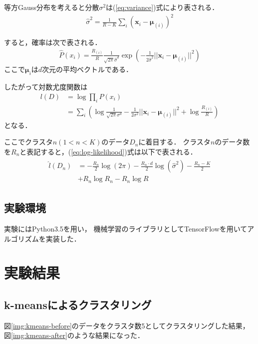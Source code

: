 \documentclass[10pt,a4j,twocolumn]{ltjsarticle}
\def\figref#1{図\ref{#1}}
\def\eqref#1{(\ref{#1})式}
\begin{document}
等方Gauss分布を考えると分散$\sigma^2$は\eqref{eq:variance}により表される．
\begin{align}
  \label{eq:variance}
  \hat{\sigma}^2 = \frac{1}{R-K}\sum_i\left({\bm x}_i-{\bm \mu}_{(i)}\right)^2
\end{align}

すると，確率は次で表される．
\begin{align}
  \label{eq:gaussian-distribution}
  \hat{P}(x_i) = \frac{R_{(i)}}{R}\frac{1}{\sqrt{2\pi}\hat{\sigma}^d}
    \exp\left(-\frac{1}{2\hat{\sigma}^2}||{\bm x}_i-{\bm \mu}_{(i)}||^2\right)
\end{align}
ここで${\bm \mu}_{i}$は$d$次元の平均ベクトルである．

したがって対数尤度関数は
\begin{align}
  \label{eq:log-likelihood}
  l(D) &= \log \prod_i P(x_i) \\\nonumber
  &= \sum_i \left( \log\frac{1}{\sqrt{2\pi}\sigma^d}-\frac{1}{2\sigma^2}||{\bm x}_i-{\bm \mu}_{(i)}||^2 + \log\frac{R_{(i)}}{R} \right)
\end{align}
となる．

ここでクラスタ$n (1 < n < K)$のデータ$D_n$に着目する．
クラスタ$n$のデータ数を$R_n$と表記すると，\eqref{eq:log-likelihood}は以下で表される．
\begin{align}
  \begin{split}
    \hat{l}(D_n) &= -\frac{R_n}{2}\log(2\pi) - \frac{R_n \cdot d}{2}\log(\hat{\sigma}^2) -
    \frac{R_n - K}{2}\\ &
    + R_n\log R_n - R_n \log R
  \end{split}
\end{align}

\subsection{実験環境}
実験にはPython3.5を用い，
機械学習のライブラリとしてTensorFlowを用いてアルゴリズムを実装した．

\section{実験結果}
\subsection{k-meansによるクラスタリング}
\figref{img:kmeans-before}のデータをクラスタ数5としてクラスタリングした結果，
\figref{img:kmeans-after}のような結果になった．
\end{document}
